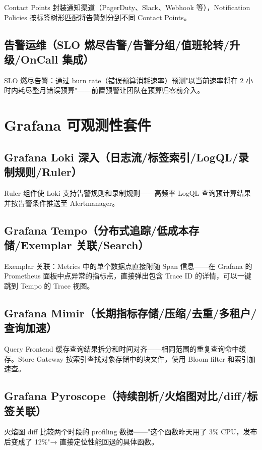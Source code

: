 \documentclass[12pt,UTF8]{ctexbook}
\begin{document}
Contact Points 封装通知渠道（PagerDuty、Slack、Webhook 等），Notification Policies 按标签树形匹配将告警划分到不同 Contact Points。

    \subsection{告警运维（SLO 燃尽告警/告警分组/值班轮转/升级/OnCall 集成）}

SLO 燃尽告警：通过 burn rate（错误预算消耗速率）预测"以当前速率将在 2 小时内耗尽整月错误预算"——前置预警让团队在预算归零前介入。

  \section{Grafana 可观测性套件}
    \subsection{Grafana Loki 深入（日志流/标签索引/LogQL/录制规则/Ruler）}

Ruler 组件使 Loki 支持告警规则和录制规则——高频率 LogQL 查询预计算结果并按告警条件推送至 Alertmanager。

    \subsection{Grafana Tempo（分布式追踪/低成本存储/Exemplar 关联/Search）}

Exemplar 关联：Metrics 中的单个数据点直接附随 Span 信息——在 Grafana 的 Prometheus 面板中点异常的指标点，直接弹出包含 Trace ID 的详情，可以一键跳到 Tempo 的 Trace 视图。

    \subsection{Grafana Mimir（长期指标存储/压缩/去重/多租户/查询加速）}

Query Frontend 缓存查询结果拆分和时间对齐——相同范围的重复查询命中缓存。Store Gateway 按索引查找对象存储中的块文件，使用 Bloom filter 和索引加速查。

    \subsection{Grafana Pyroscope（持续剖析/火焰图对比/diff/标签关联）}

火焰图 diff 比较两个时段的 profiling 数据——"这个函数昨天用了 3\% CPU，发布后变成了 12\%"→ 直接定位性能回退的具体函数。
\end{document}
